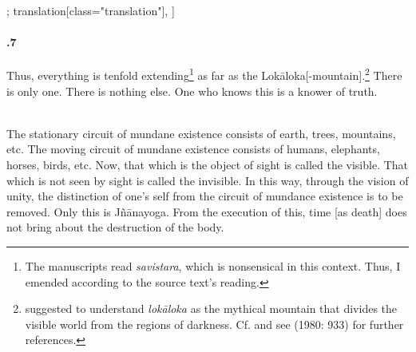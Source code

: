 \begin{alignment}[
  texts=edition[class="edition"];
  translation[class="translation"],
  ]
\begin{translation}
\begin{tlate}[21_7]
  \paragraph{.7} Thus, everything is tenfold extending\footnote{The manuscripts read \textit{savistara}, which is nonsensical in this context. Thus, I emended according to the source text’s reading.} as far as the Lokāloka[-mountain].\footnote{\citeauthor{birch2013} suggested to understand \textit{lokāloka} as the mythical mountain that divides the visible world from the regions of darkness. Cf. and see \citeauthor{apte1890practical} (1980: 933) for further references.} There is only one. There is nothing else. One who knows this is a knower of truth.
     \\\\
     \end{tlate}
     \begin{tlate}[p21_02]
       The stationary circuit of mundane existence consists of earth, trees, mountains, etc. The moving circuit of mundane existence consists of humans, elephants, horses, birds, etc. Now, that which is the object of sight is called the visible. That which is not seen by sight is called the invisible. In this way, through the vision of unity, the distinction of one's self from the circuit of mundance existence is to be removed. Only this is Jñānayoga. From the execution of this, time [as death] does not bring about the destruction of the body.
 \flushpage
    \end{tlate}
  \end{translation}
\end{alignment}
\pagebreak %
